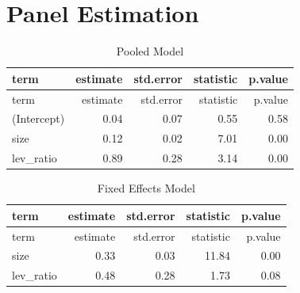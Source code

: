 \documentclass[11pt,]{article}
\begin{document}
\section{Panel Estimation}\label{panel-estimation}

\begin{longtable}[]{@{}lrrrr@{}}
\caption{Pooled Model}\tabularnewline
\toprule
term & estimate & std.error & statistic & p.value\tabularnewline
\midrule
\endfirsthead
\toprule
term & estimate & std.error & statistic & p.value\tabularnewline
\midrule
\endhead
(Intercept) & 0.04 & 0.07 & 0.55 & 0.58\tabularnewline
size & 0.12 & 0.02 & 7.01 & 0.00\tabularnewline
lev\_ratio & 0.89 & 0.28 & 3.14 & 0.00\tabularnewline
\bottomrule
\end{longtable}

\begin{longtable}[]{@{}lrrrr@{}}
\caption{Fixed Effects Model}\tabularnewline
\toprule
term & estimate & std.error & statistic & p.value\tabularnewline
\midrule
\endfirsthead
\toprule
term & estimate & std.error & statistic & p.value\tabularnewline
\midrule
\endhead
size & 0.33 & 0.03 & 11.84 & 0.00\tabularnewline
lev\_ratio & 0.48 & 0.28 & 1.73 & 0.08\tabularnewline
\bottomrule
\end{longtable}
\end{document}

